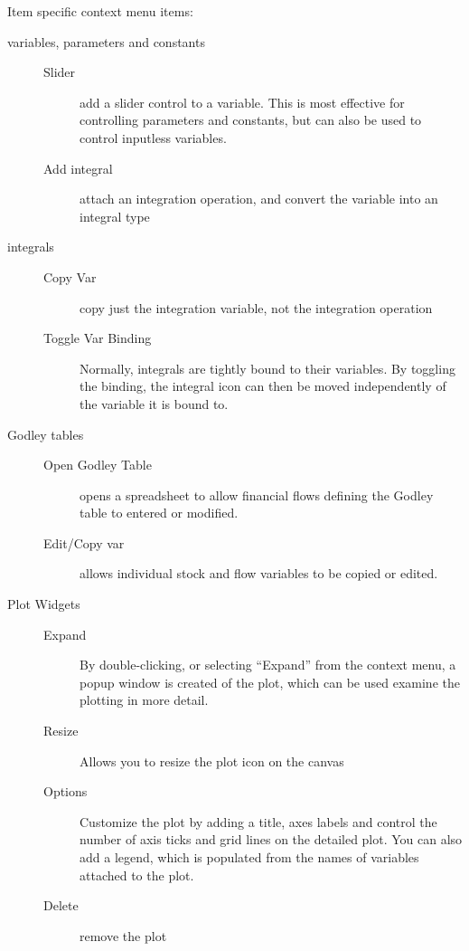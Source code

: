 Item specific context menu items:
\begin{description}
\item[variables, parameters and constants]
\begin{description}
\item[Slider] add a slider control to a variable. This is most
effective for controlling parameters and constants, but can also be
used to control inputless variables.
\item[Add integral] attach an integration operation, and convert the
variable into an integral type
\end{description}
\item[integrals]
\begin{description}
\item[Copy Var] copy just the integration variable, not the
integration operation
\item[Toggle Var Binding] Normally, integrals are tightly bound to their
variables. By toggling the binding, the integral icon can then be
moved independently of the variable it is bound to. 
\end{description}
\item[Godley tables]
\begin{description}
\item[Open Godley Table] opens a spreadsheet to allow financial flows
defining the Godley table to entered or modified.
\item[Edit/Copy var] allows individual stock and flow variables to be
copied or edited.
\end{description}
\item[Plot Widgets]
\begin{description}
\item[Expand]
By double-clicking, or selecting ``Expand'' from the context menu, a
popup window is created of the plot, which can be used examine the
plotting in more detail.

\item[Resize] Allows you to resize the plot icon on the canvas
\item[Options] Customize the plot by adding a title, axes labels and
  control the number of axis ticks and grid lines on the detailed
  plot. You can also add a legend, which is populated from the names
  of variables attached to the plot.
\item[Delete] remove the plot
\end{description}

\end{description}

